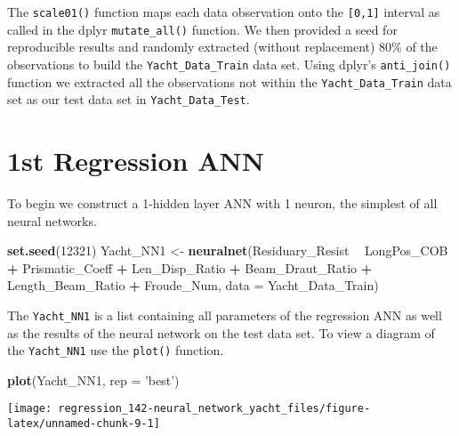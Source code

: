 \documentclass[]{book}
\newenvironment{Shaded}{\begin{snugshade}}{\end{snugshade}}
\newcommand{\DataTypeTok}[1]{\textcolor[rgb]{0.13,0.29,0.53}{#1}}
\newcommand{\DecValTok}[1]{\textcolor[rgb]{0.00,0.00,0.81}{#1}}
\newcommand{\KeywordTok}[1]{\textcolor[rgb]{0.13,0.29,0.53}{\textbf{#1}}}
\newcommand{\NormalTok}[1]{#1}
\newcommand{\OperatorTok}[1]{\textcolor[rgb]{0.81,0.36,0.00}{\textbf{#1}}}
\newcommand{\StringTok}[1]{\textcolor[rgb]{0.31,0.60,0.02}{#1}}
\begin{document}
The \texttt{scale01()} function maps each data observation onto the \texttt{{[}0,1{]}} interval as called in the dplyr \texttt{mutate\_all()} function. We then provided a seed for reproducible results and randomly extracted (without replacement) 80\% of the observations to build the \texttt{Yacht\_Data\_Train} data set. Using dplyr's \texttt{anti\_join()} function we extracted all the observations not within the \texttt{Yacht\_Data\_Train} data set as our test data set in \texttt{Yacht\_Data\_Test}.

\hypertarget{st-regression-ann}{%
\section{1st Regression ANN}\label{st-regression-ann}}

To begin we construct a 1-hidden layer ANN with 1 neuron, the simplest of all neural networks.

\begin{Shaded}
\begin{Highlighting}[]
\KeywordTok{set.seed}\NormalTok{(}\DecValTok{12321}\NormalTok{)}
\NormalTok{Yacht_NN1 <-}\StringTok{ }\KeywordTok{neuralnet}\NormalTok{(Residuary_Resist }\OperatorTok{~}\StringTok{ }\NormalTok{LongPos_COB }\OperatorTok{+}\StringTok{ }\NormalTok{Prismatic_Coeff }\OperatorTok{+}\StringTok{ }
\StringTok{                         }\NormalTok{Len_Disp_Ratio }\OperatorTok{+}\StringTok{ }\NormalTok{Beam_Draut_Ratio }\OperatorTok{+}\StringTok{ }\NormalTok{Length_Beam_Ratio }\OperatorTok{+}
\StringTok{                         }\NormalTok{Froude_Num, }\DataTypeTok{data =}\NormalTok{ Yacht_Data_Train)}
\end{Highlighting}
\end{Shaded}

The \texttt{Yacht\_NN1} is a list containing all parameters of the regression ANN as well as the results of the neural network on the test data set. To view a diagram of the \texttt{Yacht\_NN1} use the \texttt{plot()} function.

\begin{Shaded}
\begin{Highlighting}[]
\KeywordTok{plot}\NormalTok{(Yacht_NN1, }\DataTypeTok{rep =} \StringTok{'best'}\NormalTok{)}
\end{Highlighting}
\end{Shaded}

\begin{center}\texttt{[image: regression\_142-neural\_network\_yacht\_files/figure-latex/unnamed-chunk-9-1]} \end{center}
\end{document}
